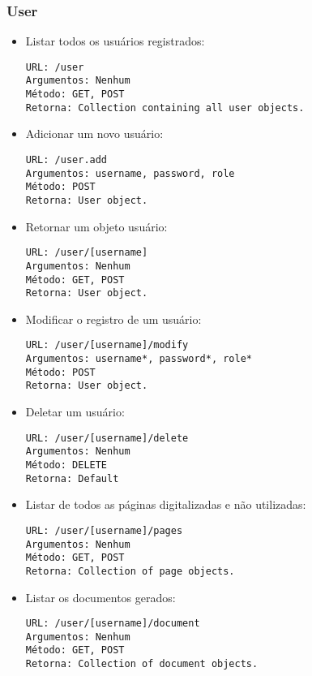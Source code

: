 \subsubsection{User}

\begin{itemize}

\item Listar todos os usuários registrados:
\begin{verbatim}
URL: /user
Argumentos: Nenhum
Método: GET, POST
Retorna: Collection containing all user objects.
\end{verbatim}

\item Adicionar um novo usuário:
\begin{verbatim}
URL: /user.add
Argumentos: username, password, role
Método: POST
Retorna: User object.
\end{verbatim}

\item Retornar um objeto usuário:
\begin{verbatim}
URL: /user/[username]
Argumentos: Nenhum
Método: GET, POST
Retorna: User object.
\end{verbatim}

\item Modificar o registro de um usuário:
\begin{verbatim}
URL: /user/[username]/modify
Argumentos: username*, password*, role*
Método: POST
Retorna: User object.
\end{verbatim}

\item Deletar um usuário:
\begin{verbatim}
URL: /user/[username]/delete
Argumentos: Nenhum
Método: DELETE
Retorna: Default
\end{verbatim}

\item Listar de todos as páginas digitalizadas e não utilizadas: 
\begin{verbatim}
URL: /user/[username]/pages
Argumentos: Nenhum
Método: GET, POST
Retorna: Collection of page objects.
\end{verbatim}

\item Listar os documentos gerados:
\begin{verbatim}
URL: /user/[username]/document
Argumentos: Nenhum
Método: GET, POST
Retorna: Collection of document objects.
\end{verbatim}


\end{itemize}
